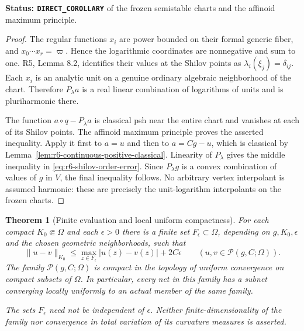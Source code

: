 \documentclass[11pt,a4paper]{article}
\numberwithin{equation}{section}
\newtheorem{theorem}{Theorem}[section]
\theoremstyle{definition}
\theoremstyle{remark}
\begin{document}
\noindent\textbf{Status: \texttt{DIRECT\_COROLLARY}} of the
frozen semistable charts and the affinoid maximum principle.

\begin{proof}
The regular functions $x_i$ are power bounded on their formal generic
fiber, and $x_0\cdots x_r=\varpi$. Hence the logarithmic coordinates
are nonnegative and sum to one. R5, Lemma 8.2, identifies their
values at the Shilov points as $\lambda_i(\xi_j)=\delta_{ij}$.
Each $x_i$ is an analytic unit on a genuine ordinary algebraic
neighborhood of the chart. Therefore $P_\lambda a$ is a real linear
combination of logarithms of units and is pluriharmonic there.

The function $a\circ q-P_\lambda a$ is classical psh near the entire
chart and vanishes at each of its Shilov points. The affinoid maximum
principle \cite[Theorem 6.4]{GR25} proves the asserted inequality.
Apply it first to $a=u$ and then to $a=Cg-u$, which is classical by
Lemma~\ref{lem:r6-continuous-positive-classical}. Linearity of
$P_\lambda$ gives the middle inequality in
\eqref{eq:r6-shilov-order-error}. Since $P_\lambda g$ is a convex
combination of values of $g$ in $V$, the final inequality follows.
No arbitrary vertex interpolant is assumed harmonic: these are
precisely the unit-logarithm interpolants on the frozen charts.
\end{proof}

\begin{theorem}[Finite evaluation and local uniform compactness]
\label{thm:r6-curvature-order-compactness}
For each compact $K_0\Subset\Omega$ and each $\epsilon>0$ there is
a finite set $F_\epsilon\subset\Omega$, depending on
$g,K_0,\epsilon$ and the chosen geometric neighborhoods, such that
\begin{equation}
 \|u-v\|_{K_0}
   \leq \max_{z\in F_\epsilon}|u(z)-v(z)|+2C\epsilon
 \qquad(u,v\in\mathscr P(g,C;\Omega)).
 \label{eq:r6-curvature-order-finite-evaluation}
\end{equation}
The family $\mathscr P(g,C;\Omega)$ is compact in the topology of
uniform convergence on compact subsets of $\Omega$. In particular,
every net in this family has a subnet converging locally uniformly
to an actual member of the same family.

The sets $F_\epsilon$ need not be independent of $\epsilon$.
Neither finite-dimensionality of the family nor convergence in
total variation of its curvature measures is asserted.
\end{theorem}
\end{document}
